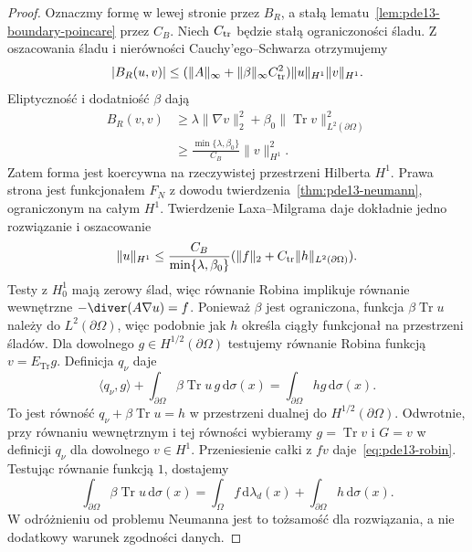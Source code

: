 \begin{proof}
Oznaczmy formę w lewej stronie przez $B_R$,
a stałą lematu~\ref{lem:pde13-boundary-poincare} przez $C_B$.
Niech $C_{\rm tr}$ będzie stałą ograniczoności śladu.
Z oszacowania śladu i nierówności Cauchy'ego--Schwarza
otrzymujemy
\[
 |B_R(u,v)|\le(\|A\|_\infty+
 \|\beta\|_\infty C_{\rm tr}^2)\|u\|_{H^1}\|v\|_{H^1}.
\]
Eliptyczność i dodatniość $\beta$ dają
\[
 \begin{aligned}
 B_R(v,v)&\ge \lambda\|\nabla v\|_2^2+
 \beta_0\|\operatorname{Tr}v\|_{L^2(\partial\Omega)}^2\\
 &\ge \frac{\min\{\lambda,\beta_0\}}{C_B}\|v\|_{H^1}^2.
 \end{aligned}
\]
Zatem forma jest koercywna na rzeczywistej przestrzeni
Hilberta $H^1$. Prawa strona jest funkcjonałem $F_N$
z dowodu twierdzenia~\ref{thm:pde13-neumann},
ograniczonym na całym $H^1$.
Twierdzenie Laxa--Milgrama daje dokładnie jedno rozwiązanie
i oszacowanie
\[
 \|u\|_{H^1}\le
 \frac{C_B}{\min\{\lambda,\beta_0\}}
 (\|f\|_2+C_{\rm tr}\|h\|_{L^2(\partial\Omega)}).
\]
Testy z $H_0^1$ mają zerowy ślad, więc równanie Robina
implikuje równanie wewnętrzne $-\diver(A\nabla u)=f$.
Ponieważ $\beta$ jest ograniczona, funkcja
$\beta\operatorname{Tr}u$ należy do $L^2(\partial\Omega)$,
więc podobnie jak $h$ określa ciągły funkcjonał
na przestrzeni śladów. Dla dowolnego
$g\in H^{1/2}(\partial\Omega)$ testujemy równanie Robina
funkcją $v=E_{\operatorname{Tr}}g$. Definicja $q_\nu$ daje
\[
 \langle q_\nu,g\rangle
 +\int_{\partial\Omega}\beta\operatorname{Tr}u\,g\,\mathrm d\sigma(x)
 =\int_{\partial\Omega}hg\,\mathrm d\sigma(x).
\]
To jest równość $q_\nu+\beta\operatorname{Tr}u=h$
w przestrzeni dualnej do $H^{1/2}(\partial\Omega)$.
Odwrotnie, przy równaniu wewnętrznym i tej równości
wybieramy $g=\operatorname{Tr}v$ i $G=v$ w definicji
$q_\nu$ dla dowolnego $v\in H^1$. Przeniesienie całki
z $fv$ daje~\eqref{eq:pde13-robin}.
Testując równanie funkcją $1$, dostajemy
\[
 \int_{\partial\Omega}\beta\operatorname{Tr}u\,\mathrm d\sigma(x)
 =\int_\Omega f\,\mathrm d\lambda_d(x)
 +\int_{\partial\Omega}h\,\mathrm d\sigma(x).
\]
W odróżnieniu od problemu Neumanna jest to tożsamość
dla rozwiązania, a nie dodatkowy warunek zgodności danych.
\end{proof}

